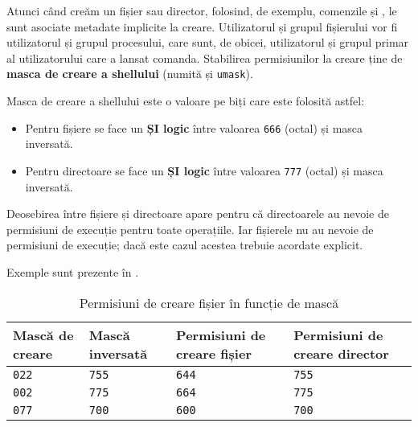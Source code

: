 Atunci când creăm un fișier sau director, folosind, de exemplu, comenzile  și , le sunt asociate metadate implicite la creare.
Utilizatorul și grupul fișierului vor fi utilizatorul și grupul procesului, care sunt, de obicei, utilizatorul și grupul primar al utilizatorului care a lansat comanda.
Stabilirea permisiunilor la creare ține de \textbf{masca de creare a shellului} (numită și \texttt{umask}).

Masca de creare a shellului este o valoare pe biți care este folosită astfel:

\begin{itemize}
  \item Pentru fișiere se face un \textbf{ȘI logic} între valoarea \texttt{666} (octal) și masca inversată.
  \item Pentru directoare se face un \textbf{ȘI logic} între valoarea \texttt{777} (octal) și masca inversată.
\end{itemize}

Deosebirea între fișiere și directoare apare pentru că directoarele au nevoie de permisiuni de execuție pentru toate operațiile.
Iar fișierele nu au nevoie de permisiuni de execuție;
dacă este cazul acestea trebuie acordate explicit.

Exemple sunt prezente în .

\begin{table}[!htb]
  \begin{center}
    \begin{tabular}{ p{} p{} p{} p{} }
      \toprule
        \textbf{Mască de creare} &
        \textbf{Mască inversată} &
        \textbf{Permisiuni de creare fișier} &
        \textbf{Permisiuni de creare director} \\
      \midrule
        \texttt{022} &
        \texttt{755} &
        \texttt{644} &
        \texttt{755} \\
      \midrule
        \texttt{002} &
        \texttt{775} &
        \texttt{664} &
        \texttt{775} \\
      \midrule
        \texttt{077} &
        \texttt{700} &
        \texttt{600} &
        \texttt{700} \\
      \bottomrule
    \end{tabular}
  \end{center}
  \caption{Permisiuni de creare fișier în funcție de mască}
  \label{table:user:umask}
\end{table}

